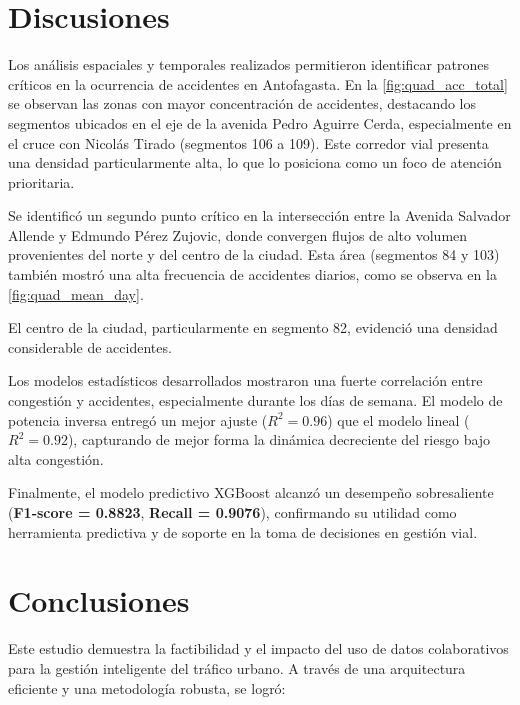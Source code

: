 \documentclass[12pt]{article}
\begin{document}
{\section{Discusiones}

Los análisis espaciales y temporales realizados permitieron identificar patrones críticos en la ocurrencia de accidentes en Antofagasta. En la \cref{fig:quad_acc_total} se observan las zonas con mayor concentración de accidentes, destacando los segmentos ubicados en el eje de la avenida Pedro Aguirre Cerda, especialmente en el cruce con Nicolás Tirado (segmentos 106 a 109). Este corredor vial presenta una densidad particularmente alta, lo que lo posiciona como un foco de atención prioritaria.

Se identificó un segundo punto crítico en la intersección entre la Avenida Salvador Allende y Edmundo Pérez Zujovic, donde convergen flujos de alto volumen provenientes del norte y del centro de la ciudad. Esta área (segmentos 84 y 103) también mostró una alta frecuencia de accidentes diarios, como se observa en la \cref{fig:quad_mean_day}.

El centro de la ciudad, particularmente en segmento 82, evidenció una densidad considerable de accidentes.

Los modelos estadísticos desarrollados mostraron una fuerte correlación entre congestión y accidentes, especialmente durante los días de semana. El modelo de potencia inversa entregó un mejor ajuste ($R^2 = 0.96$) que el modelo lineal ($R^2 = 0.92$), capturando de mejor forma la dinámica decreciente del riesgo bajo alta congestión.

Finalmente, el modelo predictivo XGBoost alcanzó un desempeño sobresaliente (\textbf{F1-score = 0.8823}, \textbf{Recall = 0.9076}), confirmando su utilidad como herramienta predictiva y de soporte en la toma de decisiones en gestión vial.




\section{Conclusiones}

Este estudio demuestra la factibilidad y el impacto del uso de datos colaborativos para la gestión inteligente del tráfico urbano. A través de una arquitectura eficiente y una metodología robusta, se logró:

}
\end{document}
